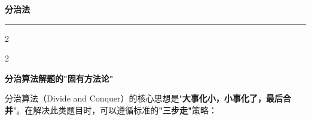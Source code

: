 \documentclass[10pt, a4paper]{article}
\begin{document}
\begin{center}
    \huge\textbf{分治法}
\end{center}

\vspace{0.3cm}
\noindent\rule{\linewidth}{0.4pt}
\vspace{0.3cm}

\begin{multicols*}{2}

\end{multicols*}

\vspace{0.5cm}

\begin{multicols*}{2}


\par\columnbreak

\par\columnbreak

\par\columnbreak

\par\columnbreak

\par\columnbreak

\par\columnbreak

\par\columnbreak

\par\columnbreak

\par\columnbreak

\par\columnbreak

\par\columnbreak

\par\columnbreak

\par\columnbreak

\par\columnbreak

\par\columnbreak

\par\columnbreak

\par\columnbreak

{\large\textbf{分治算法解题的"固有方法论"}}
\vspace{0.2cm}

分治算法（Divide and Conquer）的核心思想是"\textbf{大事化小，小事化了，最后合并}"。在解决此类题目时，可以遵循标准的\textbf{"三步走"}策略：


\end{multicols*}
\end{document}

